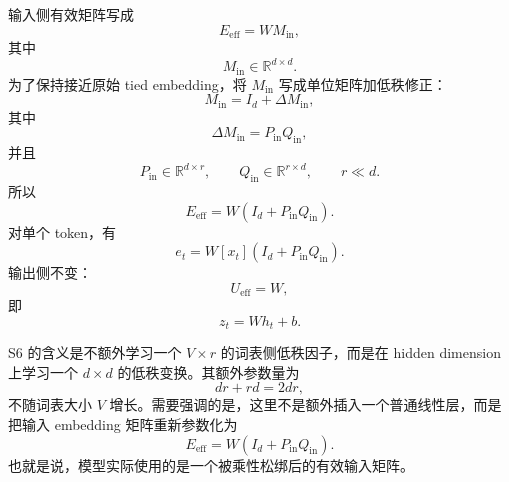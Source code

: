 输入侧有效矩阵写成
\begin{equation}
    E_{\mathrm{eff}} = W M_{\mathrm{in}},
\end{equation}
其中
\begin{equation}
    M_{\mathrm{in}} \in \mathbb{R}^{d \times d}.
\end{equation}
为了保持接近原始 tied embedding，将 $M_{\mathrm{in}}$ 写成单位矩阵加低秩修正：
\begin{equation}
    M_{\mathrm{in}} = I_d + \Delta M_{\mathrm{in}},
\end{equation}
其中
\begin{equation}
    \Delta M_{\mathrm{in}} = P_{\mathrm{in}}Q_{\mathrm{in}},
\end{equation}
并且
\begin{equation}
    P_{\mathrm{in}} \in \mathbb{R}^{d \times r}, \qquad
    Q_{\mathrm{in}} \in \mathbb{R}^{r \times d}, \qquad
    r \ll d.
\end{equation}
所以
\begin{equation}
    E_{\mathrm{eff}} =
    W(I_d + P_{\mathrm{in}}Q_{\mathrm{in}}).
\end{equation}
对单个 token，有
\begin{equation}
    e_t =
    W[x_t](I_d + P_{\mathrm{in}}Q_{\mathrm{in}}).
\end{equation}
输出侧不变：
\begin{equation}
    U_{\mathrm{eff}} = W,
\end{equation}
即
\begin{equation}
    z_t = W h_t + b.
\end{equation}

S6 的含义是不额外学习一个 $V \times r$ 的词表侧低秩因子，而是在 hidden dimension
上学习一个 $d \times d$ 的低秩变换。其额外参数量为
\begin{equation}
    dr + rd = 2dr,
\end{equation}
不随词表大小 $V$ 增长。需要强调的是，这里不是额外插入一个普通线性层，而是把输入
embedding 矩阵重新参数化为
\begin{equation}
    E_{\mathrm{eff}} =
    W(I_d + P_{\mathrm{in}}Q_{\mathrm{in}}).
\end{equation}
也就是说，模型实际使用的是一个被乘性松绑后的有效输入矩阵。

